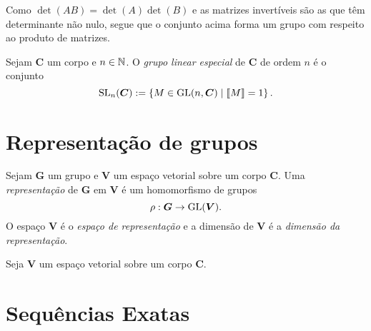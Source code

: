 Como $\det(AB) = \det(A)\det(B)$ e as matrizes invertíveis são as que têm determinante não nulo, segue que o conjunto acima forma um grupo com respeito ao produto de matrizes.

\begin{definition}
Sejam $\bm C$ um corpo e $n \in \mathbb{N}$. O \emph{grupo linear especial} de $\bm C$ de ordem $n$ é o conjunto
	\begin{equation*}
	\operatorname{SL}_n(\bm C) := \left\{{M \in \operatorname{GL}(n,\bm C)}\;\middle\vert\;{\left\llbracket{M}\right\rrbracket =1}\right\}.
	\end{equation*}
\end{definition}


\section{Representação de grupos}

\begin{definition}
Sejam $\bm G$ um grupo e $\bm V$ um espaço vetorial sobre um corpo $\bm C$. Uma \emph{representação} de $\bm G$ em $\bm V$ é um homomorfismo de grupos
	\begin{equation*}
	\rho: \bm G \to \operatorname{GL}(\bm V).
	\end{equation*}
O espaço $\bm V$ é o \emph{espaço de representação} e a dimensão de $\bm V$ é a \emph{dimensão da representação}.
\end{definition}

\begin{definition}
Seja $\bm V$ um espaço vetorial sobre um corpo $\bm C$.
\end{definition}

\section{Sequências Exatas}

